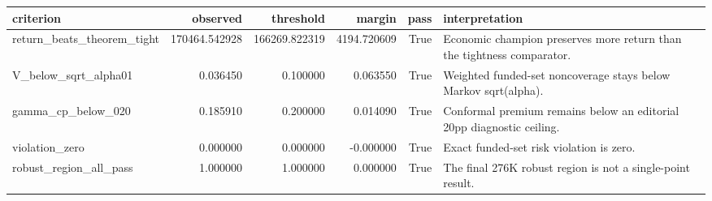 \begin{tabular}{lrrrrl}
\toprule
criterion & observed & threshold & margin & pass & interpretation \\
\midrule
return\_beats\_theorem\_tight & 170464.542928 & 166269.822319 & 4194.720609 & True & Economic champion preserves more return than the tightness comparator. \\
V\_below\_sqrt\_alpha01 & 0.036450 & 0.100000 & 0.063550 & True & Weighted funded-set noncoverage stays below Markov sqrt(alpha). \\
gamma\_cp\_below\_020 & 0.185910 & 0.200000 & 0.014090 & True & Conformal premium remains below an editorial 20pp diagnostic ceiling. \\
violation\_zero & 0.000000 & 0.000000 & -0.000000 & True & Exact funded-set risk violation is zero. \\
robust\_region\_all\_pass & 1.000000 & 1.000000 & 0.000000 & True & The final 276K robust region is not a single-point result. \\
\bottomrule
\end{tabular}
